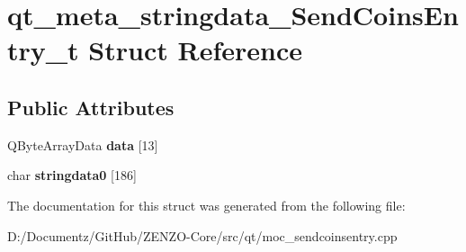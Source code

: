 \hypertarget{structqt__meta__stringdata___send_coins_entry__t}{}\section{qt\+\_\+meta\+\_\+stringdata\+\_\+\+Send\+Coins\+Entry\+\_\+t Struct Reference}
\label{structqt__meta__stringdata___send_coins_entry__t}
\subsection*{Public Attributes}
\begin{DoxyCompactItemize}
\item 
\mbox{\label{structqt__meta__stringdata___send_coins_entry__t_acdac8258d2f6d52da308314013d47589}} 
Q\+Byte\+Array\+Data {\bfseries data} \mbox{[}13\mbox{]}
\item 
\mbox{\label{structqt__meta__stringdata___send_coins_entry__t_a394e7911255c264eb0de4d50d70c3585}} 
char {\bfseries stringdata0} \mbox{[}186\mbox{]}
\end{DoxyCompactItemize}


The documentation for this struct was generated from the following file\+:\begin{DoxyCompactItemize}
\item 
D\+:/\+Documentz/\+Git\+Hub/\+Z\+E\+N\+Z\+O-\/\+Core/src/qt/moc\+\_\+sendcoinsentry.\+cpp\end{DoxyCompactItemize}
